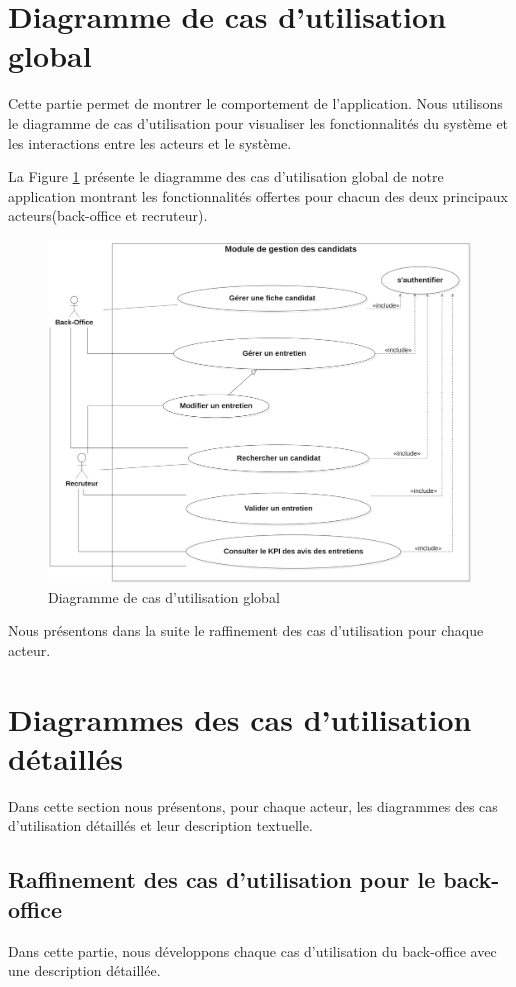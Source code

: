 \section{Diagramme de cas d'utilisation global}
Cette partie permet de montrer le comportement de l'application. Nous utilisons le diagramme de cas d'utilisation pour visualiser les fonctionnalités du système et les interactions entre les acteurs et le système.

La Figure \ref{fig:cas_utilisation_global} présente le diagramme des cas d'utilisation global de notre application montrant les fonctionnalités offertes pour chacun des deux principaux acteurs(back-office et recruteur).
 
 \begin{figure}[H]
     \centering
     \includegraphics[scale=0.4]{img/UseCaseDiagramv4.png}
     \caption{Diagramme de cas d'utilisation global}
     \label{fig:cas_utilisation_global}
 \end{figure}
Nous présentons dans la suite le raffinement des cas d'utilisation pour chaque acteur.
\section{Diagrammes des cas d'utilisation détaillés}
Dans cette section nous présentons, pour chaque acteur, les diagrammes des cas d'utilisation détaillés et leur description textuelle.
\subsection{Raffinement des cas d'utilisation pour le back-office}
Dans cette partie, nous développons chaque cas d'utilisation du back-office avec une description détaillée.

